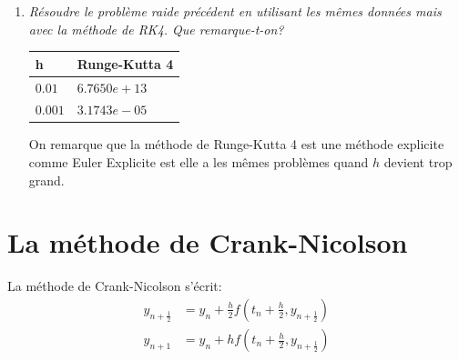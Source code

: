 \documentclass[a4paper,10pt]{article}
\begin{document}
\begin{enumerate}
    \item \emph{Résoudre le problème raide précédent en utilisant les mêmes données
    mais avec la méthode de RK4. Que remarque-t-on?}

\begin{center}
    \begin{tabular}{|l|l|}\hline
        h         & Runge-Kutta 4 \\\hline
        $0.01$    & $6.7650e+13$  \\\hline
        $0.001$   & $3.1743e-05$     \\\hline
    \end{tabular}
\end{center}

    On remarque que la méthode de Runge-Kutta 4 est une méthode explicite comme
    Euler Explicite est elle a les mêmes problèmes quand $h$ devient trop grand.
\end{enumerate}

\section{La méthode de Crank-Nicolson}

La méthode de Crank-Nicolson s'écrit:
\begin{align}
    y_{n + \frac{1}{2}} & = y_n + \frac{h}{2} f(t_n + \frac{h}{2}, y_{n + \frac{1}{2}})
    \\\nonumber
    y_{n + 1} & = y_n + hf(t_n + \frac{h}{2}, y_{n + \frac{1}{2}})
\end{align}
\end{document}
